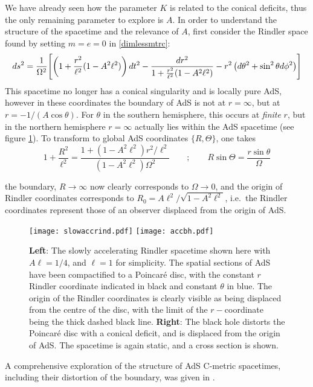 \documentclass[
twoside,openright,frontopenright]{dmathesis}
\begin{document}
We have already seen how the parameter $K$ is related to the conical
deficits, thus the only remaining parameter to explore is $A$. In order
to understand the structure of the spacetime and the relevance of $A$,
first consider the Rindler space found by
setting $m=e=0$ in \eqref{dimlessmtrc}:
\begin{equation}
ds^2=\frac{1}{\Omega^2}\Biggl[ 
\left ( 1 + \frac{r^2}{\ell^2} (1-A^2 \ell^2) \right) dt^2
-\frac{dr^2}{1 + \frac{r^2}{\ell^2}(1-A^2\ell^2)} - r^2 \left ( d\theta^2
+ \sin^2 \theta d\phi^2\right)\Biggr]\\
\end{equation}
This spacetime no longer has a conical singularity and is locally pure AdS,
however in these coordinates the boundary of AdS is not at $r=\infty$, but at
$r = -1/(A\cos\theta)$. For $\theta$ in the southern hemisphere, this occurs at
{\it finite} $r$, but in the northern hemisphere $r=\infty$ actually lies within
the AdS spacetime (see figure \ref{fig:accbh}). To transform to global AdS
coordinates $\{R,\Theta\}$, one takes \cite{Podolsky:2002nk}
\begin{equation}
1 + \frac{R^2}{\ell^2} = \frac{1 + (1-A^2\ell^2)r^2/\ell^2}{(1-A^2\ell^2)\Omega^2}
\qquad;\qquad
R \sin\Theta = \frac{r\sin\theta}{\Omega}
\end{equation}

the boundary, $R\to\infty$ now clearly corresponds to $\Omega\to 0$, 
and the origin of Rindler coordinates corresponds to
$R_0 = A \ell^2/\sqrt{1-A^2\ell^2}$, i.e.\ the Rindler coordinates represent
those of an observer displaced from the origin of AdS.
\begin{figure}
\texttt{[image: slowaccrind.pdf]}
\texttt{[image: accbh.pdf]}
\caption{{\bf Left}: The slowly accelerating Rindler spacetime shown here with
  $A\ell = 1/4$, and $\ell=1$ for simplicity. The spatial sections of AdS have
  been compactified to a Poincar\'e disc, with the constant $r$ Rindler
  coordinate indicated in black and constant $\theta$ in blue. The origin of the
  Rindler coordinates is clearly visible as being displaced from the centre of
  the disc, with the limit of the $r-$coordinate being the thick dashed black
  line.  {\bf Right}: The black hole distorts the Poincar\'e disc with a conical
  deficit, and is displaced from the origin of AdS. The spacetime is again
  static, and a cross section is shown. }
\label{fig:accbh}
\end{figure}
A comprehensive exploration of the structure of AdS C-metric spacetimes, 
including their distortion of the boundary, was given in \cite{Krtous:2005ej}.
\end{document}
